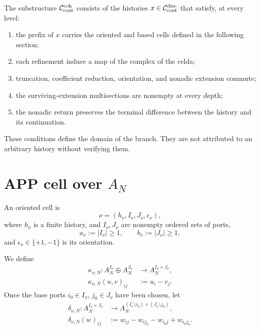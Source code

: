 The substructure \(\mathcal C_{\rm cont}^{\rm coh}\) consists of the histories
\(x\in\mathcal C_{\rm cont}^{\rm disc}\) that satisfy, at every level:
\begin{enumerate}
 \item the prefix of \(x\) carries the oriented and based cells defined in
       the following section;
 \item each refinement induce a map of the complex of the celda;
 \item truncation, coefficient reduction, orientation, and nonadic
       extension commute;
 \item the surviving-extension multisections are nonempty at every
       depth;
 \item the nonadic return preserves the terminal difference between the history and its continuation.
\end{enumerate}
These conditions define the domain of the branch. They are not attributed to an
arbitrary history without verifying them.

\section{APP cell over \texorpdfstring{\(A_N\)}{AN}}
\label{sec:pdfv2-coh-cell}

An oriented cell is
\[
 \nu=(h_\nu,I_\nu,J_\nu,\epsilon_\nu),
\]
where \(h_\nu\) is a finite history, and \(I_\nu,J_\nu\) are nonempty
ordered sets of ports,
\[
 a_\nu:=|I_\nu|\geq1,
 \qquad
 b_\nu:=|J_\nu|\geq1,
\]
and \(\epsilon_\nu\in\{+1,-1\}\) is its orientation.

We define
\begin{equation}\label{eq:pdfv2-coh-kappa}
 \begin{aligned}
 \kappa_{\nu,N}:
 A_N^{I_\nu}\oplus A_N^{J_\nu}
 &\longrightarrow A_N^{I_\nu\times J_\nu},\\
 \kappa_{\nu,N}(u,v)_{ij}&:=u_i-v_j.
 \end{aligned}
\end{equation}
Once the base ports \(i_0\in I_\nu\), \(j_0\in J_\nu\) have been chosen, let
\begin{equation}\label{eq:pdfv2-coh-delta}
 \begin{aligned}
 \delta_{\nu,N}:A_N^{I_\nu\times J_\nu}
 &\longrightarrow
 A_N^{(I_\nu\setminus i_0)\times(J_\nu\setminus j_0)},\\
 \delta_{\nu,N}(w)_{ij}
 &:={}
 w_{ij}-w_{i j_0}-w_{i_0j}+w_{i_0j_0}.
 \end{aligned}
\end{equation}

